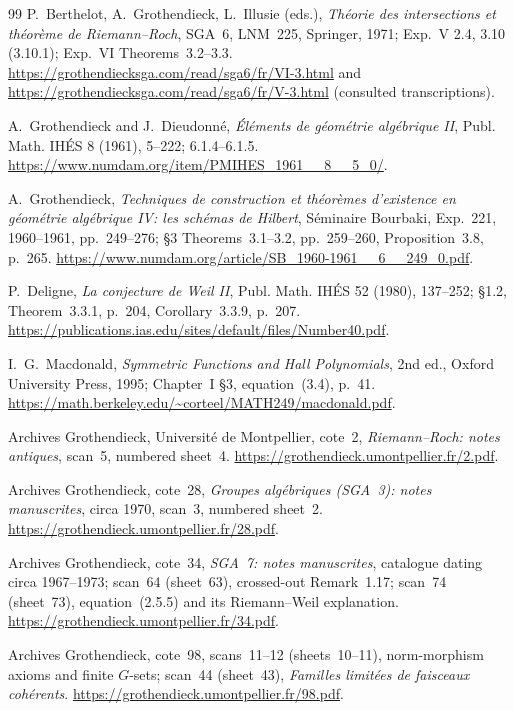 \documentclass[11pt,a4paper]{article}
\begin{document}
\begin{thebibliography}{99}
 P.~Berthelot, A.~Grothendieck, L.~Illusie (eds.),
\emph{Th\'eorie des intersections et th\'eor\`eme de Riemann--Roch}, SGA~6,
LNM~225, Springer, 1971; Exp.~V 2.4, 3.10 (3.10.1);
Exp.~VI Theorems~3.2--3.3.
\url{https://grothendiecksga.com/read/sga6/fr/VI-3.html} and
\url{https://grothendiecksga.com/read/sga6/fr/V-3.html} (consulted transcriptions).


 A.~Grothendieck and J.~Dieudonn\'e, \emph{\'El\'ements de g\'eom\'etrie
alg\'ebrique II}, Publ. Math. IH\'ES 8 (1961), 5--222; 6.1.4--6.1.5.
\url{https://www.numdam.org/item/PMIHES_1961__8__5_0/}.


 A.~Grothendieck, \emph{Techniques de construction et th\'eor\`emes
d'existence en g\'eom\'etrie alg\'ebrique IV: les sch\'emas de Hilbert},
S\'eminaire Bourbaki, Exp.~221, 1960--1961, pp.~249--276;
\S3 Theorems~3.1--3.2, pp.~259--260, Proposition~3.8, p.~265.
\url{https://www.numdam.org/article/SB_1960-1961__6__249_0.pdf}.


 P.~Deligne, \emph{La conjecture de Weil II}, Publ. Math. IH\'ES 52
(1980), 137--252; \S1.2, Theorem~3.3.1, p.~204, Corollary~3.3.9, p.~207.
\url{https://publications.ias.edu/sites/default/files/Number40.pdf}.


 I.~G.~Macdonald, \emph{Symmetric Functions and Hall Polynomials},
2nd ed., Oxford University Press, 1995; Chapter~I \S3, equation~(3.4), p.~41.
\url{https://math.berkeley.edu/~corteel/MATH249/macdonald.pdf}.


 Archives Grothendieck, Universit\'e de Montpellier, cote~2,
\emph{Riemann--Roch: notes antiques}, scan~5, numbered sheet~4.
\url{https://grothendieck.umontpellier.fr/2.pdf}.


 Archives Grothendieck, cote~28, \emph{Groupes alg\'ebriques
(SGA~3): notes manuscrites}, circa 1970, scan~3, numbered sheet~2.
\url{https://grothendieck.umontpellier.fr/28.pdf}.


 Archives Grothendieck, cote~34,
\emph{SGA~7: notes manuscrites}, catalogue dating circa 1967--1973;
scan~64 (sheet~63), crossed-out Remark~1.17; scan~74 (sheet~73),
equation~(2.5.5) and its Riemann--Weil explanation.
\url{https://grothendieck.umontpellier.fr/34.pdf}.


 Archives Grothendieck, cote~98, scans~11--12 (sheets~10--11),
norm-morphism axioms and finite $G$-sets; scan~44 (sheet~43),
\emph{Familles limit\'ees de faisceaux coh\'erents}.
\url{https://grothendieck.umontpellier.fr/98.pdf}.



\end{thebibliography}
\end{document}
